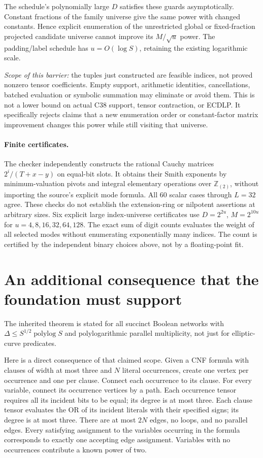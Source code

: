 \documentclass[11pt]{article}
\begin{document}
The schedule's polynomially large $D$ satisfies these guards
asymptotically. Constant fractions of the family universe give the
same power with changed constants. Hence explicit enumeration of the
unrestricted global or fixed-fraction projected candidate universe
cannot improve its $M/\sqrt u$ power. The padding/label schedule has
$u=O(\log S)$, retaining the existing logarithmic scale.

\emph{Scope of this barrier:} the tuples just constructed are feasible
indices, not proved nonzero tensor coefficients. Empty support, arithmetic
identities, cancellations, batched evaluation or symbolic summation may
eliminate or avoid them. This is not a lower bound on actual C38 support,
tensor contraction, or ECDLP. It specifically rejects claims that a new
enumeration order or constant-factor matrix improvement changes this
power while still visiting that universe.

\paragraph{Finite certificates.}
The checker independently constructs the rational Cauchy matrices
$2^i/(T+x-y)$ on equal-bit slots. It obtains their Smith exponents by
minimum-valuation pivots and integral elementary operations over
$\mathbb Z_{(2)}$, without importing the source's explicit mode formula.
All 60 scalar cases through $L=32$ agree. These checks do not establish
the extension-ring or nilpotent assertions at arbitrary sizes.
Six explicit large index-universe certificates use
$D=2^{2u}$, $M=2^{10u}$ for $u=4,8,16,32,64,128$.
The exact sum of digit counts evaluates the weight of all selected modes
without enumerating exponentially many indices. The count is certified
by the independent binary choices above, not by a floating-point fit.

\section{An additional consequence that the foundation must support}
The inherited theorem is stated for all succinct Boolean networks with
$\Delta\le S^{1/2}\operatorname{polylog}S$ and polylogarithmic parallel
multiplicity, not just for elliptic-curve predicates.

Here is a direct consequence of that claimed scope. Given a CNF formula
with clauses of width at most three and $N$ literal occurrences, create
one vertex per occurrence and one per clause. Connect each occurrence
to its clause. For every variable, connect its occurrence vertices by
a path. Each occurrence tensor requires all its incident bits to be
equal; its degree is at most three. Each clause tensor evaluates the
OR of its incident literals with their specified signs; its degree is
at most three. There are at most $2N$ edges, no loops, and no parallel
edges. Every satisfying assignment to the variables occurring in the
formula corresponds to exactly one accepting edge assignment. Variables
with no occurrences contribute a known power of two.
\end{document}
